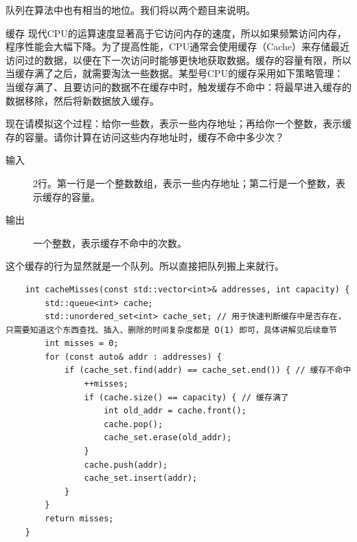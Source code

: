 队列在算法中也有相当的地位。我们将以两个题目来说明。

\begin{example}{缓存}{}
    现代CPU的运算速度显著高于它访问内存的速度，所以如果频繁访问内存，程序性能会大幅下降。为了提高性能，CPU通常会使用缓存（Cache）来存储最近访问过的数据，以便在下一次访问时能够更快地获取数据。缓存的容量有限，所以当缓存满了之后，就需要淘汰一些数据。某型号CPU的缓存采用如下策略管理：当缓存满了、且要访问的数据不在缓存中时，触发缓存不命中：将最早进入缓存的数据移除，然后将新数据放入缓存。

    现在请模拟这个过程：给你一些数，表示一些内存地址；再给你一个整数，表示缓存的容量。请你计算在访问这些内存地址时，缓存不命中多少次？

    \begin{description}
        \item[输入] 2行。第一行是一个整数数组，表示一些内存地址；第二行是一个整数，表示缓存的容量。
        \item[输出] 一个整数，表示缓存不命中的次数。
    \end{description}
    \tcblower
    这个缓存的行为显然就是一个队列。所以直接把队列搬上来就行。

    \begin{verbatim}
    int cacheMisses(const std::vector<int>& addresses, int capacity) {
        std::queue<int> cache;
        std::unordered_set<int> cache_set; // 用于快速判断缓存中是否存在，只需要知道这个东西查找、插入、删除的时间复杂度都是 O(1) 即可，具体讲解见后续章节
        int misses = 0;
        for (const auto& addr : addresses) {
            if (cache_set.find(addr) == cache_set.end()) { // 缓存不命中
                ++misses;
                if (cache.size() == capacity) { // 缓存满了
                    int old_addr = cache.front();
                    cache.pop();
                    cache_set.erase(old_addr);
                }
                cache.push(addr);
                cache_set.insert(addr);
            }
        }
        return misses;
    }
    \end{verbatim}
\end{example}

